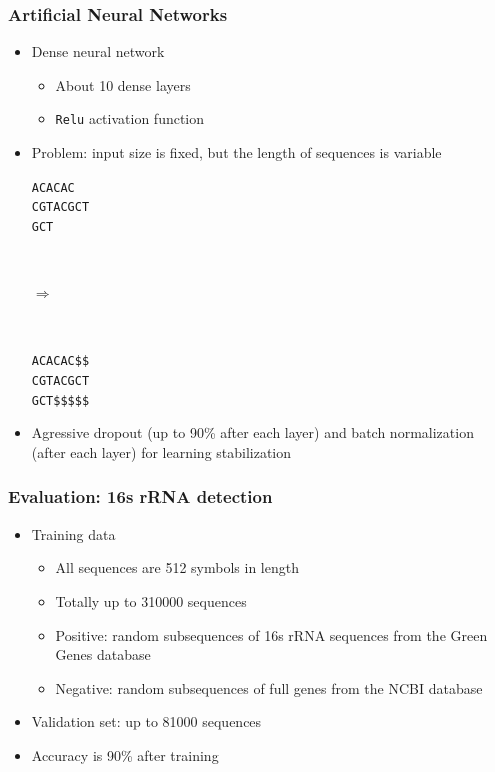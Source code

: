 \documentclass[xcolor=table]{beamer}
\begin{document}
\begin{frame} \frametitle{Artificial Neural Networks}

\begin{itemize}
  \item Dense neural network
  \begin{itemize}
    \item About 10 dense layers
    \item \texttt{Relu} activation function
  \end{itemize}
  \item Problem: input size is fixed, but the length of sequences is variable \\
  \begin{center}
  \begin{minipage}[t]{0.28\textwidth}
    \texttt{ACACAC \\
    CGTACGCT \\
    GCT}
  \end{minipage}~
  \begin{minipage}[m]{0.18\textwidth}
    \vspace{1cm}
    $\Rightarrow$
  \end{minipage}~
  \begin{minipage}[t]{0.28\textwidth}
    \texttt{ACACAC\$\$ \\
    CGTACGCT \\
    GCT\$\$\$\$\$}
  \end{minipage}
\end{center}

  \item Agressive dropout (up to 90\% after each layer) and batch normalization (after each layer) for learning stabilization
\end{itemize}

\end{frame}

\begin{frame} \frametitle{Evaluation: 16s rRNA detection}
\begin{itemize}
 \item Training data
 \begin{itemize}
   \item All sequences are 512 symbols in length
   \item Totally up to 310000 sequences
  \item Positive: random subsequences of 16s rRNA sequences from the Green Genes database
  \item Negative: random subsequences of full genes from the NCBI database
 \end{itemize}
\item Validation set: up to 81000 sequences
\item Accuracy is 90\% after training
\end{itemize}

\end{frame}
\end{document}
